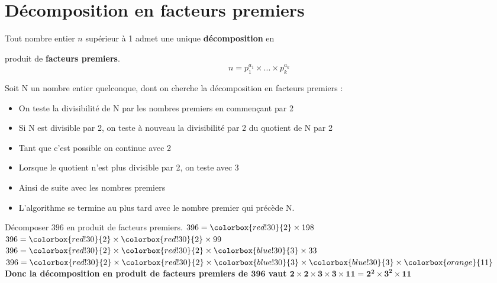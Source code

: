 \section{Décomposition en facteurs premiers}

\begin{propriete}[\admise]
Tout nombre entier $n$ supérieur à 1 admet une unique \textbf{décomposition} en 

produit de \textbf{facteurs premiers}.
$$n=p_1^{a_1}\times...\times p_k^{a_k}$$
\end{propriete}

\begin{methode}
    \label{N2methode4}
    Soit N un nombre entier quelconque, dont on cherche la décomposition en facteurs premiers :
    \begin{itemize}
        \item On teste la divisibilité de N par les nombres premiers en commençant par 2
        \item Si N est divisible par 2, on teste à nouveau la divisibilité par 2 du quotient de N par 2
        \item Tant que c'est possible on continue avec 2
        \item Lorsque le quotient n'est plus divisible par 2, on teste avec 3
        \item Ainsi de suite avec les nombres premiers 
        \item L'algorithme se termine au plus tard avec le nombre premier qui précède N.
    \end{itemize}
    \exercice
    Décomposer $396$ en produit de facteurs premiers.
    \correction
    $396 = \colorbox{red!30}{2} \times  198$\\
    $396 = \colorbox{red!30}{2} \times  \colorbox{red!30}{2} \times  99$\\
    $396 = \colorbox{red!30}{2} \times  \colorbox{red!30}{2} \times  \colorbox{blue!30}{3} \times  33$\\
    $396 = \colorbox{red!30}{2} \times  \colorbox{red!30}{2} \times  \colorbox{blue!30}{3} \times  \colorbox{blue!30}{3} \times  \colorbox{orange}{11}$\\
    {\bfseries Donc la décomposition en produit de facteurs premiers de $\mathbf{396}$ vaut $\mathbf{2 \times  2 \times  3 \times  3 \times  11 = 2^2\times 3^2\times 11}$}

\end{methode}

